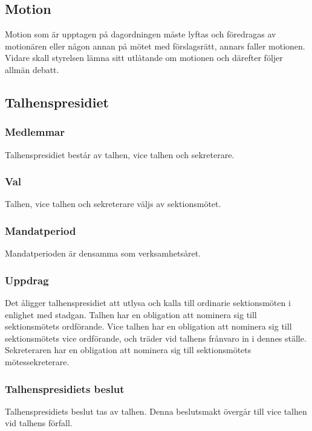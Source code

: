 \subsection{Motion} 
Motion som är upptagen på dagordningen måste lyftas och föredragas av motionären eller någon annan på mötet med förslagsrätt, annars faller motionen. Vidare skall styrelsen lämna sitt utlåtande om motionen och därefter följer allmän debatt.
\subsection{Talhenspresidiet}
\subsubsection{Medlemmar}
Talhenspresidiet består av talhen, vice talhen och sekreterare.
\subsubsection{Val}
Talhen, vice talhen och sekreterare väljs av sektionsmötet.
\subsubsection{Mandatperiod}
Mandatperioden är densamma som verksamhetsåret.
\subsubsection{Uppdrag}
Det åligger talhenspresidiet att utlysa och kalla till ordinarie sektionsmöten i enlighet med stadgan. Talhen har en obligation att nominera sig till sektionsmötets ordförande. Vice talhen har en obligation att nominera sig till sektionsmötets vice ordförande, och träder vid talhens frånvaro in i dennes ställe. Sekreteraren har en obligation att nominera sig till sektionsmötets mötessekreterare.
\subsubsection{Talhenspresidiets beslut}
Talhenspresidiets beslut tas av talhen. Denna beslutsmakt övergår till
vice talhen vid talhens förfall.

\newpage


